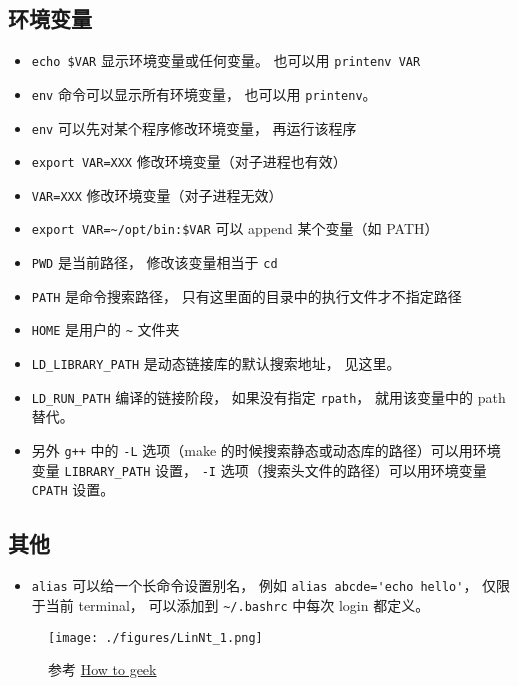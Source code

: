\subsection{环境变量}
\begin{itemize}
\item \verb|echo $VAR| 显示环境变量或任何变量。 也可以用 \verb|printenv VAR|
\item \verb|env| 命令可以显示所有环境变量， 也可以用 \verb|printenv|。
\item \verb|env| 可以先对某个程序修改环境变量， 再运行该程序
\item \verb|export VAR=XXX| 修改环境变量（对子进程也有效）
\item \verb|VAR=XXX| 修改环境变量（对子进程无效）
\item \verb|export VAR=~/opt/bin:$VAR| 可以 append 某个变量（如 PATH）
\item \verb|PWD| 是当前路径， 修改该变量相当于 \verb|cd|
\item \verb|PATH| 是命令搜索路径， 只有这里面的目录中的执行文件才不指定路径
\item \verb|HOME| 是用户的 \verb|~| 文件夹
\item \verb|LD_LIBRARY_PATH| 是动态链接库的默认搜索地址， 见这里。
\item \verb|LD_RUN_PATH| 编译的链接阶段， 如果没有指定 \verb|rpath|， 就用该变量中的 path 替代。
\item 另外 \verb|g++| 中的 \verb|-L| 选项（make 的时候搜索静态或动态库的路径）可以用环境变量 \verb|LIBRARY_PATH| 设置， \verb|-I| 选项（搜索头文件的路径）可以用环境变量 \verb|CPATH| 设置。
\end{itemize}

\subsection{其他}
\begin{itemize}
\item \verb`alias` 可以给一个长命令设置别名， 例如 \verb|alias abcde='echo hello'|， 仅限于当前 terminal， 可以添加到 \verb|~/.bashrc| 中每次 login 都定义。
\end{itemize}


\begin{figure}[ht]
\centering
\texttt{[image: ./figures/LinNt\_1.png]}
\caption{参考 \href{https://www.howtogeek.com/}{How to geek}} \label{LinNt_fig1}
\end{figure}
